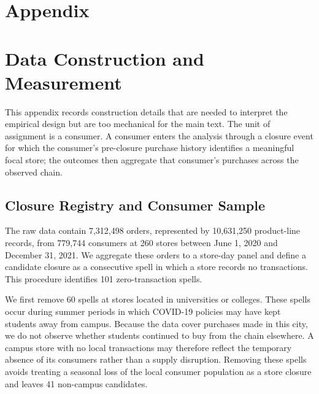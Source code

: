 \documentclass[11 pt]{article}
\begin{document}



\newpage
\appendix

\setcounter{figure}{0}
\renewcommand{\thefigure}{A\arabic{figure}}

\setcounter{table}{0}
\renewcommand{\thetable}{A\arabic{table}}

\setcounter{equation}{0}
\renewcommand{\theequation}{A\arabic{equation}}
\renewcommand{\theHequation}{A\arabic{equation}}

\setcounter{footnote}{0}
\renewcommand{\thefootnote}{\alph{footnote}}

\clearpage
\section*{\centering Appendix}


\section{Data Construction and Measurement}
\label{app:data_construction}

This appendix records construction details that are needed to interpret the empirical design but are too mechanical for the main text. The unit of assignment is a consumer. A consumer enters the analysis through a closure event for which the consumer's pre-closure purchase history identifies a meaningful focal store; the outcomes then aggregate that consumer's purchases across the observed chain.

\subsection{Closure Registry and Consumer Sample}
\label{app:closure_registry}

The raw data contain 7,312,498 orders, represented by 10,631,250 product-line records, from 779,744 consumers at 260 stores between June 1, 2020 and December 31, 2021. We aggregate these orders to a store-day panel and define a candidate closure as a consecutive spell in which a store records no transactions. This procedure identifies 101 zero-transaction spells.

We first remove 60 spells at stores located in universities or colleges. These spells occur during summer periods in which COVID-19 policies may have kept students away from campus. Because the data cover purchases made in this city, we do not observe whether students continued to buy from the chain elsewhere. A campus store with no local transactions may therefore reflect the temporary absence of its consumers rather than a supply disruption. Removing these spells avoids treating a seasonal loss of the local consumer population as a store closure and leaves 41 non-campus candidates.
\end{document}
